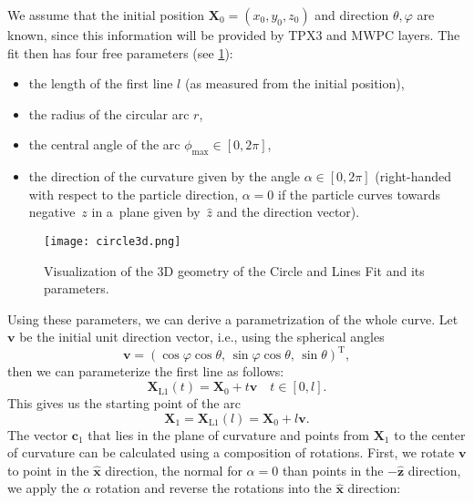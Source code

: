 			We assume that the initial position $\mathbf{X}_0 = (x_0,y_0,z_0)$ and direction $\theta,\varphi$ are known, since this information will be provided by \ac{TPX3} and \ac{MWPC} layers. The fit then has four free parameters (see \cref{fig:circle3d}):
				\begin{itemize}[nosep]
					\item the length of the first line $l$ (as measured from the initial position),
					\item the radius of the circular arc $r$,
					\item the central angle of the arc $\phi_\text{max} \in [0,2\pi]$,
					\item the direction of the curvature given by the angle $\alpha \in [0,2\pi]$ (right-handed with respect to the particle direction, $\alpha = 0$ if the particle curves towards negative~$z$ in a~plane given by~$\hat{z}$ and the direction vector).
				\end{itemize}
			\begin{figure}
				\centering
				\texttt{[image: circle3d.png]}
				\caption{Visualization of the 3D geometry of the Circle and Lines Fit and its parameters.}
				\label{fig:circle3d}
			\end{figure}
			Using these parameters, we can derive a parametrization of the whole curve. Let $\mathbf{v}$ be the initial unit direction vector, i.e., using the spherical angles
				\begin{equation}
					\mathbf{v} = (\cos\varphi\cos\theta, \,\sin\varphi\cos\theta, \,\sin\theta)^\mathrm{T},
				\end{equation}
			then we can parameterize the first line as follows:
				\begin{equation}
					\mathbf{X}_\text{L1}(t) = \mathbf{X}_0 + t\mathbf{v} \quad t\in[0,l].
				\end{equation}
			This gives us the starting point of the arc
				\begin{equation}
					\mathbf{X}_1 = \mathbf{X}_\text{L1}(l) = \mathbf{X}_0 + l\mathbf{v}.
				\end{equation}
			The vector $\mathbf{c}_1$ that lies in the plane of curvature and points from $\mathbf{X}_1$ to the center of curvature can be calculated using a composition of rotations. First, we rotate $\mathbf{v}$ to point in the $\mathbf{\hat{x}}$ direction, the normal for $\alpha = 0$ than points in the $-\mathbf{\hat{z}}$ direction, we apply the $\alpha$ rotation and reverse the rotations into the $\mathbf{\hat{x}}$ direction:
